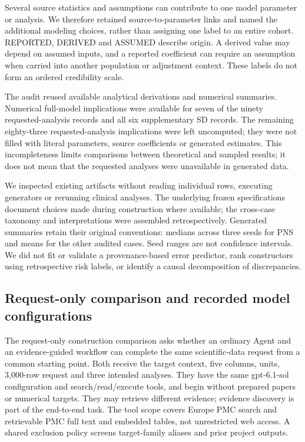 \documentclass[11pt,letterpaper]{article}
\begin{document}
Several source statistics and assumptions can contribute to one model parameter or analysis. We therefore retained source-to-parameter links and named the additional modeling choices, rather than assigning one label to an entire cohort. REPORTED, DERIVED and ASSUMED describe origin. A derived value may depend on assumed inputs, and a reported coefficient can require an assumption when carried into another population or adjustment context. These labels do not form an ordered credibility scale.


The audit reused available analytical derivations and numerical summaries. Numerical full-model implications were available for seven of the ninety requested-analysis records and all six supplementary SD records. The remaining eighty-three requested-analysis implications were left uncomputed; they were not filled with literal parameters, source coefficients or generated estimates. This incompleteness limits comparisons between theoretical and sampled results; it does not mean that the requested analyses were unavailable in generated data.


We inspected existing artifacts without reading individual rows, executing generators or rerunning clinical analyses. The underlying frozen specifications document choices made during construction where available; the cross-case taxonomy and interpretations were assembled retrospectively. Generated summaries retain their original conventions: medians across three seeds for PNS and means for the other audited cases. Seed ranges are not confidence intervals. We did not fit or validate a provenance-based error predictor, rank constructors using retrospective risk labels, or identify a causal decomposition of discrepancies.


\subsection{Request-only comparison and recorded model configurations}

The request-only construction comparison asks whether an ordinary Agent and an evidence-guided workflow can complete the same scientific-data request from a common starting point. Both receive the target context, five columns, units, 3,000-row request and three intended analyses. They have the same gpt-6.1-sol configuration and search/\allowbreak{}read/\allowbreak{}execute tools, and begin without prepared papers or numerical targets. They may retrieve different evidence; evidence discovery is part of the end-to-end task. The tool scope covers Europe PMC search and retrievable PMC full text and embedded tables, not unrestricted web access. A shared exclusion policy screens target-family aliases and prior project outputs.
\end{document}

